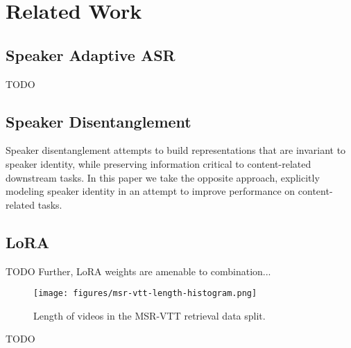 \section{Related Work}

\subsection{Speaker Adaptive ASR}

TODO

\subsection{Speaker Disentanglement}

Speaker disentanglement attempts to build representations that are invariant to speaker identity, while preserving information critical to content-related downstream tasks. 
In this paper we take the opposite approach, explicitly modeling speaker identity in an attempt to improve performance on content-related tasks.


\subsection{LoRA}

TODO
Further, LoRA weights are amenable to combination...

\begin{figure}[h]
      \centering
      \texttt{[image: figures/msr-vtt-length-histogram.png]}
      \caption{Length of videos in the MSR-VTT retrieval data split.}
      \label{fig:length_histogram}
\end{figure}

TODO
